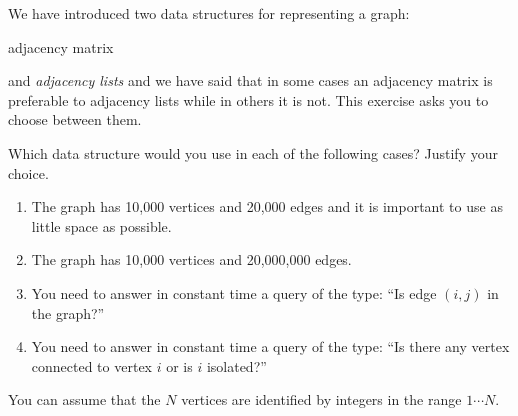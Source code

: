 We have introduced two data structures for representing a graph: {\em

adjacency matrix} and {\em adjacency lists} and we have said that
in some cases an adjacency matrix is preferable to adjacency lists
while in others it is not. This exercise asks you to choose
between them.

  Which data structure would you use
in each of the following cases?  Justify your choice.

\begin{enumerate}

\item  The graph has 10,000 vertices and 20,000 edges and it is important
to use as little space as possible.

\item  The graph has 10,000 vertices and 20,000,000 edges.

\item  You need to answer in constant time a query of the type:  ``Is
edge $(i,j)$ in the graph?''

\item  You need to answer in constant time a query of the type:  ``Is
there any vertex  connected to vertex $i$ or is $i$ isolated?''

\end{enumerate}

You can assume that the $N$ vertices are identified by integers in the
range $1 \cdots  N$.
